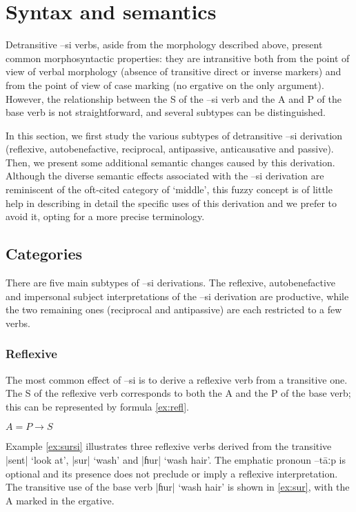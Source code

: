 \documentclass[twoside,a4paper,11pt]{article}
\newcommand{\ipa}[1]{{\phon#1}}
\begin{document}
\section{Syntax and semantics}
Detransitive \ipa{–si}  verbs, aside from the morphology described above, present common morphosyntactic properties: they are intransitive both from the point of view of verbal morphology (absence of transitive direct or inverse markers) and from the point of view of case marking (no ergative on the only argument). However,  the relationship between the S of the \ipa{–si}  verb and the A and P of the base verb is not straightforward, and several subtypes can be distinguished.

In this section, we first study the various subtypes of detransitive \ipa{--si} derivation (reflexive, autobenefactive, reciprocal, antipassive, anticausative and passive). Then, we present some additional semantic changes caused by this derivation. Although the diverse semantic effects associated with the \ipa{--si} derivation are reminiscent of the oft-cited category of `middle', this fuzzy concept is of little help in describing in detail  the specific uses of this derivation and we prefer to avoid it, opting for a more precise terminology.

\subsection{Categories} \label{sec:categories}
There are five main subtypes of \ipa{--si} derivations. The reflexive, autobenefactive and impersonal subject interpretations of the \ipa{--si} derivation are productive, while the two remaining ones (reciprocal and antipassive) are each restricted to a few verbs.  


\subsubsection{Reflexive}
The most common effect of \ipa{–si} is to derive a reflexive verb from a transitive one. The S of the reflexive verb corresponds to both the A and the P of the base verb; this  can be represented by  formula \ref{ex:refl}.

\begin{exe}
\ex \label{ex:refl}
\glt $A = P \rightarrow S$
\end{exe}

Example \ref{ex:sursi} illustrates three reflexive verbs derived from the transitive |\ipa{sent}| `look at', |\ipa{sur}| `wash' and |\ipa{ɦur}| `wash hair'. The emphatic pronoun \ipa{--tāːp} is optional and its presence does not preclude or imply a reflexive interpretation. The transitive use of the base verb |\ipa{ɦur}| `wash hair'  is shown in \ref{ex:sur}, with the A marked in the ergative.
\end{document}
